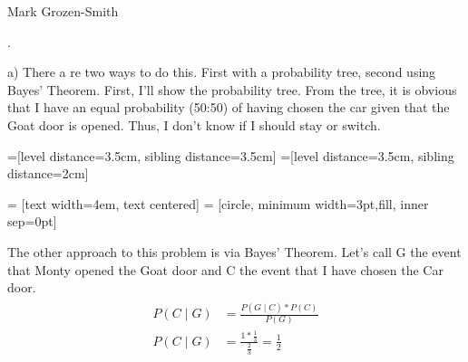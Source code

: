 \documentclass[11pt]{article}
\begin{document}
 \hfill Mark Grozen-Smith

\bigskip

.

	a) There a re two ways to do this.  First with a probability tree, second using Bayes' Theorem.  First, I'll show the probability tree.  From the tree, it is obvious that I have an equal probability (50:50) of having chosen the car given that the Goat door is opened. Thus, I don't know if I should stay or switch.  

=[level distance=3.5cm, sibling distance=3.5cm]
=[level distance=3.5cm, sibling distance=2cm]

 = [text width=4em, text centered]
 = [circle, minimum width=3pt,fill, inner sep=0pt]




	The other approach to this problem is via Bayes' Theorem.  Let's call G the event that Monty opened
	the Goat door and C the event that I have chosen the Car door.  
	\begin{gather}
	\begin{align*}
		P(C \mid G) &= \frac{P(G \mid C)*P(C)}{P(G)} \\
		P(C \mid G) &= \frac{1*\frac{1}{3}}{\frac{2}{3}} = \boxed{\frac{1}{2}}
	\end{align*}
	\end{gather}
\end{document}
